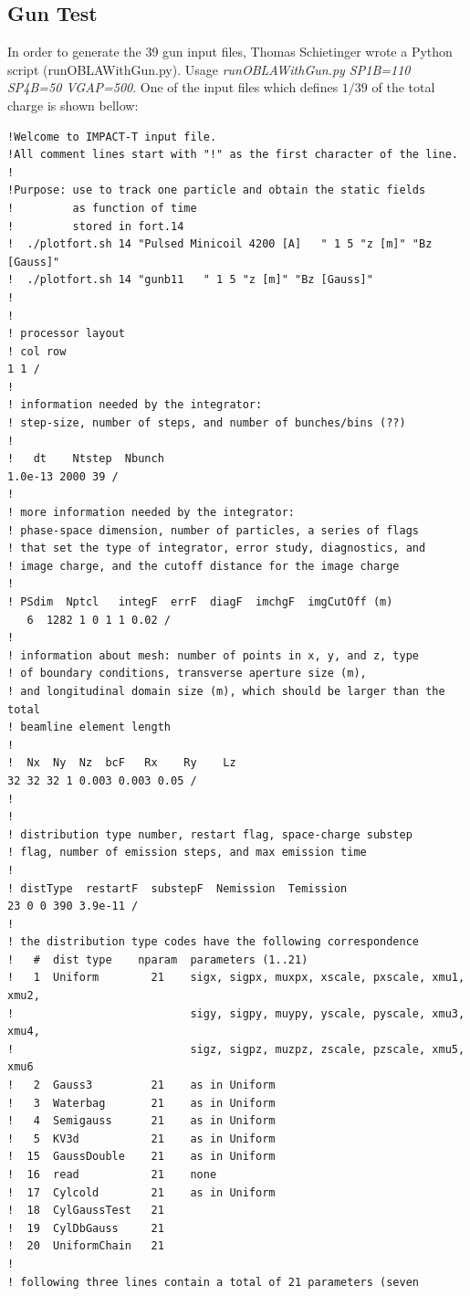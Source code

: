 \documentclass{psi-note}    %
\begin{document}
\subsection{Gun Test}
In order to generate the 39 gun input files, Thomas Schietinger wrote a Python
script (runOBLAWithGun.py). Usage {\it runOBLAWithGun.py SP1B=110 SP4B=50
VGAP=500}.
One of the input files which defines $1/39$ of the total charge is shown bellow: 
\begin{verbatim}
!Welcome to IMPACT-T input file.
!All comment lines start with "!" as the first character of the line.
!
!Purpose: use to track one particle and obtain the static fields 
!         as function of time
!         stored in fort.14
!  ./plotfort.sh 14 "Pulsed Minicoil 4200 [A]   " 1 5 "z [m]" "Bz [Gauss]"
!  ./plotfort.sh 14 "gunb11   " 1 5 "z [m]" "Bz [Gauss]"  
!
!
! processor layout
! col row
1 1 /
!
! information needed by the integrator:
! step-size, number of steps, and number of bunches/bins (??)
!
!   dt    Ntstep  Nbunch
1.0e-13 2000 39 /
!
! more information needed by the integrator:
! phase-space dimension, number of particles, a series of flags
! that set the type of integrator, error study, diagnostics, and
! image charge, and the cutoff distance for the image charge
!
! PSdim  Nptcl   integF  errF  diagF  imchgF  imgCutOff (m)
   6  1282 1 0 1 1 0.02 /
!
! information about mesh: number of points in x, y, and z, type
! of boundary conditions, transverse aperture size (m), 
! and longitudinal domain size (m), which should be larger than the total
! beamline element length
!
!  Nx  Ny  Nz  bcF   Rx    Ry    Lz
32 32 32 1 0.003 0.003 0.05 /
!
!
! distribution type number, restart flag, space-charge substep
! flag, number of emission steps, and max emission time
!
! distType  restartF  substepF  Nemission  Temission
23 0 0 390 3.9e-11 /
!
! the distribution type codes have the following correspondence
!   #  dist type    nparam  parameters (1..21)
!   1  Uniform        21    sigx, sigpx, muxpx, xscale, pxscale, xmu1, xmu2,
!                           sigy, sigpy, muypy, yscale, pyscale, xmu3, xmu4,
!                           sigz, sigpz, muzpz, zscale, pzscale, xmu5, xmu6
!   2  Gauss3         21    as in Uniform
!   3  Waterbag       21    as in Uniform
!   4  Semigauss      21    as in Uniform
!   5  KV3d           21    as in Uniform
!  15  GaussDouble    21    as in Uniform
!  16  read           21    none
!  17  Cylcold        21    as in Uniform
!  18  CylGaussTest   21   
!  19  CylDbGauss     21   
!  20  UniformChain   21   
!
! following three lines contain a total of 21 parameters (seven

\end{verbatim}
\end{document}
